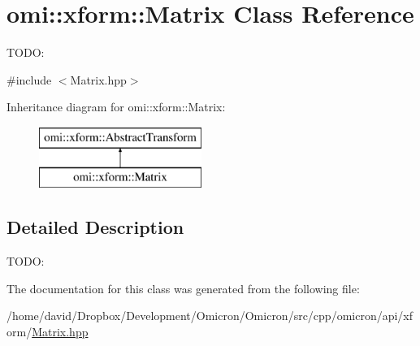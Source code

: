 \hypertarget{classomi_1_1xform_1_1_matrix}{}\section{omi\+:\+:xform\+:\+:Matrix Class Reference}
\label{classomi_1_1xform_1_1_matrix}


T\+O\+DO\+:  




{\ttfamily \#include $<$Matrix.\+hpp$>$}

Inheritance diagram for omi\+:\+:xform\+:\+:Matrix\+:\begin{figure}[H]
\begin{center}
\leavevmode
\includegraphics[height=2.000000cm]{classomi_1_1xform_1_1_matrix}
\end{center}
\end{figure}


\subsection{Detailed Description}
T\+O\+DO\+: 

The documentation for this class was generated from the following file\+:\begin{DoxyCompactItemize}
\item 
/home/david/\+Dropbox/\+Development/\+Omicron/\+Omicron/src/cpp/omicron/api/xform/\hyperlink{_matrix_8hpp}{Matrix.\+hpp}\end{DoxyCompactItemize}
